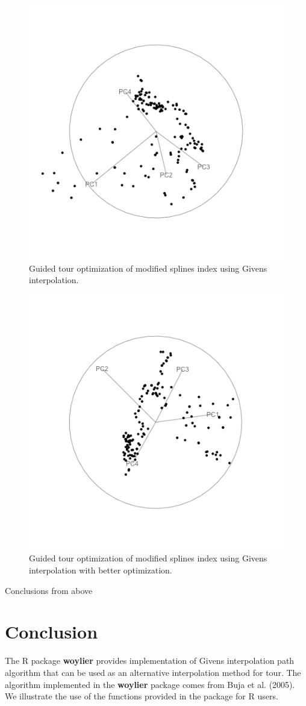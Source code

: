 \begin{figure}

{\centering \includegraphics[width=0.5\linewidth]{guided_givens} 

}

\caption{Guided tour optimization of modified splines index using Givens interpolation.}\label{fig:guided-givens-static}
\end{figure}

\begin{figure}

{\centering \includegraphics[width=0.5\linewidth]{guided_givens_random} 

}

\caption{Guided tour optimization of modified splines index using Givens interpolation with better optimization.}\label{fig:guided-givens-random-static}
\end{figure}

Conclusions from above

\hypertarget{conclusion}{%
\section{Conclusion}\label{conclusion}}

The R package \textbf{woylier} provides implementation of Givens interpolation path algorithm that can be used as an alternative interpolation method for tour. The algorithm implemented in the \textbf{woylier} package comes from Buja et al. (2005). We illustrate the use of the functions provided in the package for R users.

